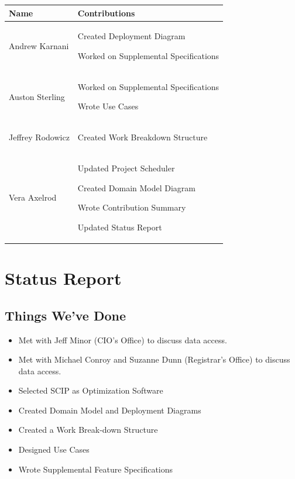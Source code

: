 \documentclass[11pt]{article}
\newenvironment{packed_itemize}{
\begin{itemize}
  \setlength{\itemsep}{1pt}
  \setlength{\parskip}{0pt}
  \setlength{\parsep}{0pt}
}{\end{itemize}}
\begin{document}
\begin{tabular}{|m{1.4in}|m{4in}|}
\hline
\textbf{\large Name}     & \textbf{\large Contributions} \\
\hline\hline
 Andrew Karnani
	&
	 \begin{packed_itemize}
		\item Created Deployment Diagram
		\item Worked on Supplemental Specifications
	\end{packed_itemize}
\\
\hline
 Auston Sterling
	&
	 \begin{packed_itemize}
	        \item Worked on Supplemental Specifications
		\item Wrote Use Cases
	\end{packed_itemize}
\\
\hline
Jeffrey Rodowicz
	&
	 \begin{packed_itemize}
		\item Created Work Breakdown Structure
	\end{packed_itemize}
\\
\hline
Vera Axelrod
	&
	 \begin{packed_itemize}
		 \item Updated Project Scheduler
		\item Created Domain Model Diagram
		\item Wrote Contribution Summary
		\item Updated Status Report
	\end{packed_itemize}
\\
\hline
\end{tabular}

\section{Status Report} %

\subsection{Things We've Done}
\begin{itemize}
\item Met with Jeff Minor (CIO's Office) to discuss data access.
\item Met with Michael Conroy and Suzanne Dunn (Registrar's Office) to discuss data access.
\item Selected SCIP as Optimization Software
\item Created Domain Model and Deployment Diagrams
\item Created a Work Break-down Structure
\item Designed Use Cases
\item Wrote Supplemental Feature Specifications

\end{itemize}
\end{document}
